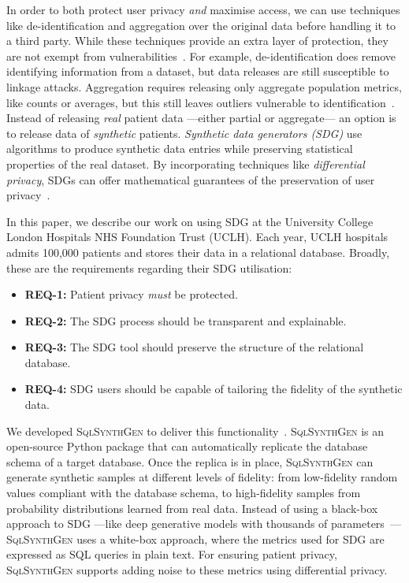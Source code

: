 \documentclass[11pt]{article}
\begin{document}
In order to both protect user privacy \emph{and} maximise access, we can use techniques like de-identification and aggregation over the original data before handling 
it to a third party.
While these techniques provide an extra layer of protection, they are not exempt from vulnerabilities~\cite{near2021}.
For example, de-identification does remove identifying information from a dataset, but data releases are still susceptible to linkage attacks.
Aggregation requires releasing only aggregate population metrics, like counts or averages, but this still leaves outliers vulnerable to identification~\cite{tucker2020}.
Instead of releasing \emph{real} patient data ---either partial or aggregate--- an option is to release data of \emph{synthetic} patients.
\emph{Synthetic data generators (SDG)} use algorithms to produce synthetic data entries while preserving statistical properties of the real dataset.
By incorporating techniques like \emph{differential privacy}, SDGs can offer mathematical guarantees of the preservation of user privacy~\cite{Kopp2021MicrosoftSD}.


In this paper, we describe our work on using SDG at the University College London Hospitals NHS Foundation Trust (UCLH).
Each year, UCLH hospitals admits 100,000 patients and stores their data in a relational database.
Broadly, these are the requirements regarding their SDG utilisation:

\begin{itemize}
  \item \textbf{REQ-1:} Patient privacy \emph{must} be protected.
  \item \textbf{REQ-2:} The SDG process should be transparent and explainable.
  \item \textbf{REQ-3:} The SDG tool should preserve the structure of the relational database.
  \item \textbf{REQ-4:} SDG users should be capable of tailoring the fidelity of the synthetic data.
\end{itemize}

We developed \textsc{SqlSynthGen} to deliver this functionality~\cite{repository}.
\textsc{SqlSynthGen} is an open-source Python package that can automatically replicate the database schema of a target database.
Once the replica is in place, \textsc{SqlSynthGen} can generate synthetic samples at different levels of fidelity: from low-fidelity random values compliant with the database schema, to high-fidelity samples from probability distributions learned from real data.
Instead of using a black-box approach to SDG ---like deep generative models with thousands of parameters~\cite{DBLP:journals/pami/Bond-TaylorLLW22}--- \textsc{SqlSynthGen} uses a white-box approach, where the metrics used for SDG are expressed as SQL queries in plain text.
For ensuring patient privacy, \textsc{SqlSynthGen} supports adding noise to these metrics using differential privacy.
\end{document}
